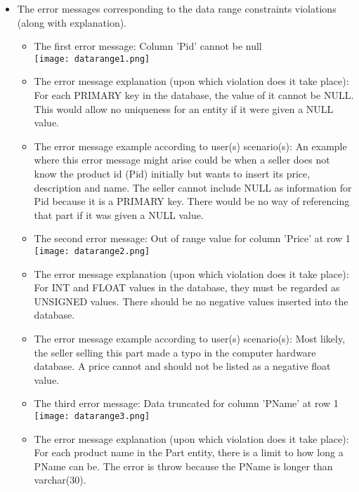 {\begin{itemize}
\begin{itemize}
	 \end{itemize}
\item{}
	The error messages corresponding to the data range constraints violations (along with explanation).
	\begin{itemize} 
	\item{The first error message: }
	Column 'Pid' cannot be null\\
	\texttt{[image: datarange1.png]}
	\item{The error message explanation (upon which violation does it take place): }
	For each PRIMARY key in the database, the value of it cannot be NULL. This would allow no uniqueness for an entity if it were given a NULL value. 
	\item{The error message example according to user(s) scenario(s): }
	An example where this error message might arise could be when a seller does not know the product id (Pid) initially but wants to insert its price, description and name. The seller cannot include NULL as information for Pid because it is a PRIMARY key. There would be no way of referencing that part if it was given a NULL value. 
	 \end{itemize}
	 	\begin{itemize} 
	\item{The second error message: }
	Out of range value for column 'Price' at row 1\\
	\texttt{[image: datarange2.png]}
	\item{The error message explanation (upon which violation does it take place): }
	For INT and FLOAT values in the database, they must be regarded as UNSIGNED values. There should be no negative values inserted into the database. 
	\item{The error message example according to user(s) scenario(s): }
	Most likely, the seller selling this part made a typo in the computer hardware database. A price cannot and should not be listed as a negative float value. 
	 \end{itemize}
\begin{itemize} 
	\item{The third error message: }
	Data truncated for column 'PName' at row 1\\
	\texttt{[image: datarange3.png]}
	\item{The error message explanation (upon which violation does it take place): }
	For each product name in the Part entity, there is a limit to how long a PName can be. The error is throw because the PName is longer than varchar(30).

\end{itemize}
\end{itemize}}
